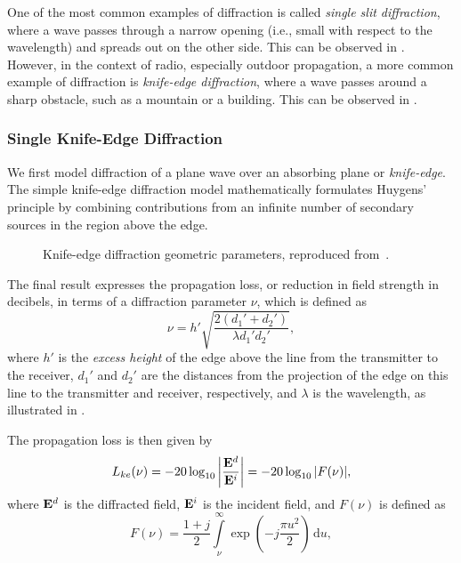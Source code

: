 One of the most common examples of diffraction is called \emph{single slit diffraction}, where a wave passes through a narrow opening (i.e., small with respect to the \gls{wavelength}) and spreads out on the other side. This can be observed in . However, in the context of radio, especially outdoor propagation, a more common example of diffraction is \emph{knife-edge diffraction}, where a wave passes around a sharp obstacle, such as a mountain or a building. This can be observed in .

\subsubsection{Single Knife-Edge Diffraction}

We first model diffraction of a plane wave over an absorbing plane or \emph{knife-edge}. The simple knife-edge diffraction model mathematically formulates Huygens' principle by combining contributions from an infinite number of secondary sources in the region above the edge.

\begin{figure}
  \centering
  \caption{Knife-edge diffraction geometric parameters, reproduced from~\cite[Fig.~3.16]{Saunders2024}.}
\end{figure}

The final result expresses the propagation loss, or reduction in field strength in decibels, in terms of a diffraction parameter $\nu$, which is defined as
\begin{equation}
  \nu = h'\sqrt{\frac{2\left(d_1' + d_2'\right)}{\lambda d_1' d_2'}},
\end{equation}
where $h'$ is the \emph{excess height} of the edge above the line from the transmitter to the receiver, $d_1'$ and $d_2'$ are the distances from the projection of the edge on this line to the transmitter and receiver, respectively, and $\lambda$ is the \gls{wavelength}, as illustrated in .

The propagation loss is then given by
\begin{equation}
  L_{ke}(\nu) = -20 \log_{10}\left|\frac{\mathbf{E}^d}{\mathbf{E}^i}\right| = -20 \log_{10} |F(\nu)|,
\end{equation}
where $\mathbf{E}^d$ is the diffracted field, $\mathbf{E}^i$ is the incident field, and $F(\nu)$ is defined as
\begin{equation}\label{eq:transition-function-knife-edge}
  F(\nu) = \frac{1+j}{2} \int\limits_{\nu}^{\infty} \exp\left(-j \frac{\pi u^2}{2}\right) \,\mathrm{d}u,
\end{equation}

